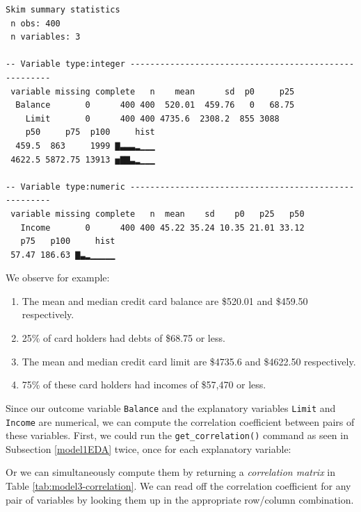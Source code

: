 \documentclass[12pt, krantz2,]{krantz}
\makeatletter
\newenvironment{Shaded}{\begin{snugshade}}{\end{snugshade}}
\newcommand{\KeywordTok}[1]{\textcolor[rgb]{0.27,0.27,0.27}{\textbf{#1}}}
\newcommand{\NormalTok}[1]{#1}
\newcommand{\OperatorTok}[1]{\textcolor[rgb]{0.43,0.43,0.43}{\textbf{#1}}}
\newcommand{\StringTok}[1]{\textcolor[rgb]{0.5,0.5,0.5}{#1}}
\providecommand{\tightlist}{%
  \setlength{\itemsep}{0pt}\setlength{\parskip}{0pt}}
\newenvironment{kframe}{%
\medskip{}
\setlength{\fboxsep}{.8em}
 \def\at@end@of@kframe{}%
 \ifinner\ifhmode%
  \def\at@end@of@kframe{\end{minipage}}%
  \begin{minipage}{\columnwidth}%
 \fi\fi%
 \def\FrameCommand##1{\hskip\@totalleftmargin \hskip-\fboxsep
 \colorbox{shadecolor}{##1}\hskip-\fboxsep
     \hskip-\linewidth \hskip-\@totalleftmargin \hskip\columnwidth}%
 \MakeFramed {\advance\hsize-\width
   \@totalleftmargin\z@ \linewidth\hsize
   \@setminipage}}%
 {\par\unskip\endMakeFramed%
 \at@end@of@kframe}
\renewenvironment{Shaded}{\begin{kframe}}{\end{kframe}}
\makeatother
\begin{document}
\begin{verbatim}
Skim summary statistics
 n obs: 400 
 n variables: 3 

-- Variable type:integer ------------------------------------------------------
 variable missing complete   n    mean      sd  p0     p25
  Balance       0      400 400  520.01  459.76   0   68.75
    Limit       0      400 400 4735.6  2308.2  855 3088   
    p50     p75  p100     hist
  459.5  863     1999 ▇▃▃▃▂▁▁▁
 4622.5 5872.75 13913 ▅▇▇▃▂▁▁▁

-- Variable type:numeric ------------------------------------------------------
 variable missing complete   n  mean    sd    p0   p25   p50
   Income       0      400 400 45.22 35.24 10.35 21.01 33.12
   p75   p100     hist
 57.47 186.63 ▇▃▂▁▁▁▁▁
\end{verbatim}

We observe for example:

\begin{enumerate}
\def\labelenumi{\arabic{enumi}.}
\tightlist
\item
  The mean and median credit card balance are \$520.01 and \$459.50 respectively.
\item
  25\% of card holders had debts of \$68.75 or less.
\item
  The mean and median credit card limit are \$4735.6 and \$4622.50 respectively.
\item
  75\% of these card holders had incomes of \$57,470 or less.
\end{enumerate}

Since our outcome variable \texttt{Balance} and the explanatory variables \texttt{Limit} and
\texttt{Income} are numerical, we can compute the correlation coefficient between pairs
of these variables. First, we could run the \texttt{get\_correlation()} command as seen
in Subsection \ref{model1EDA} twice, once for each explanatory variable:

\begin{Shaded}
\end{Shaded}

Or we can simultaneously compute them by returning a \emph{correlation matrix} in
Table \ref{tab:model3-correlation}. We can read off the correlation coefficient
for any pair of variables by looking them up in the appropriate row/column combination.
\end{document}
